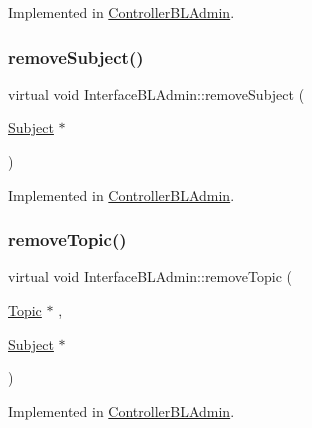 Implemented in \hyperlink{class_controller_b_l_admin_ad504705ce46509672751a4adfe1fa773}{Controller\+B\+L\+Admin}.

\mbox{\label{class_interface_b_l_admin_aed60dd105ebed648c834d57c6b1c9224}} 
\subsubsection{\texorpdfstring{remove\+Subject()}{removeSubject()}}
{\footnotesize\ttfamily virtual void Interface\+B\+L\+Admin\+::remove\+Subject (\begin{DoxyParamCaption}\item[{\hyperlink{class_subject}{Subject} $\ast$}]{ }\end{DoxyParamCaption})\hspace{0.3cm}{\ttfamily [pure virtual]}}



Implemented in \hyperlink{class_controller_b_l_admin_ab6be786a6347283943640ccba01ac2d1}{Controller\+B\+L\+Admin}.

\mbox{\label{class_interface_b_l_admin_a9ec942ebf3eb4a742de514801a378aca}} 
\subsubsection{\texorpdfstring{remove\+Topic()}{removeTopic()}}
{\footnotesize\ttfamily virtual void Interface\+B\+L\+Admin\+::remove\+Topic (\begin{DoxyParamCaption}\item[{\hyperlink{class_topic}{Topic} $\ast$}]{,  }\item[{\hyperlink{class_subject}{Subject} $\ast$}]{ }\end{DoxyParamCaption})\hspace{0.3cm}{\ttfamily [pure virtual]}}



Implemented in \hyperlink{class_controller_b_l_admin_a615837120d6e4ba94fa32f13d2e8fac1}{Controller\+B\+L\+Admin}.

\mbox{\label{class_interface_b_l_admin_abe950882707e9b393dd989af66ab2f9f}} 
